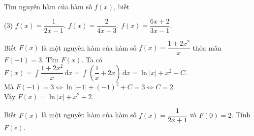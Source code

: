 \begin{vd} Tìm nguyên hàm của hàm số $f(x)$, biết
	\begin{tasks}(3)
		\task $f(x)=\dfrac{1}{2x-1}$.
		\task $f(x)=\dfrac{2}{4x-3}$.
		\task $f(x)=\dfrac{6x + 2}{3x - 1}$.
	\end{tasks}
\end{vd}

\begin{vd}
	Biết $F(x)$ là một nguyên hàm của hàm số $f(x)=\dfrac{1+2x^2}{x}$ thỏa mãn $F(-1)=3$. Tìm $F(x)$.
	\loigiai
	{
		Ta có $F(x)=\displaystyle\int \dfrac{1+2x^2}{x}\mathrm{\,d}x=\displaystyle\int \left(\dfrac{1}{x}+2x\right)\mathrm{\,d}x=\ln|x|+x^2+C$.\\
		Mà $F(-1)=3\Leftrightarrow \ln|-1|+(-1)^2+C=3\Leftrightarrow C=2$.\\
		Vậy $F(x)=\ln|x|+x^2+2$.
	}
\end{vd}

\begin{vd}
	Biết $F(x)$ là một nguyên hàm của hàm số $f(x)=\dfrac{1}{2x+1}$ và $F(0)=2$. Tính $F(\mathrm{e})$.
\end{vd}

